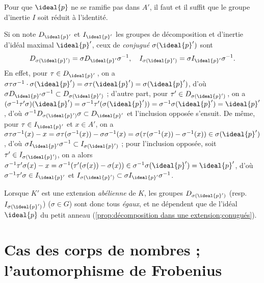 \documentclass[11pt, useosf,
  title in boldface,
  theorem in new line,
  theorem numbering = section,
  number theorems separately,
]{simplivre}
\begin{document}
\enlargethispage*{\baselineskip}
    \begin{corollary}\label{cor:ramification et groupe d'inertie}
        Pour que \( \ideal{p} \) ne se ramifie pas dans \( A' \), il faut et il suffit que le groupe d'inertie \( I \) soit réduit à l'identité.
    \end{corollary}

    \begin{remark}
        Si on note \( D_{\ideal{p}'} \) et \( I_{\ideal{p}'} \) les groupes de décomposition et d'inertie d'idéal maximal \( \ideal{p}' \), ceux de \emph{conjugué} \( \sigma(\ideal{p}') \) sont
        \begin{equation}
            D_{\sigma(\ideal{p}')} = \sigma D_{\ideal{p}'} \sigma^{-1}, \quad
            I_{\sigma(\ideal{p}')} = \sigma I_{\ideal{p}'} \sigma^{-1}.
        \end{equation}
        En effet, pour \( \tau \in D_{\ideal{p}'} \)\,, on a \( \sigma \tau \sigma^{-1} \cdot \sigma(\ideal{p}') = \sigma\tau(\ideal{p}') = \sigma(\ideal{p}') \), d'où \( \sigma D_{\ideal{p}'} \sigma^{-1} \subset D_{\sigma(\ideal{p}')} \) ; d'autre part, pour \( \tau' \in D_{\sigma(\ideal{p}')} \)\,, on a \( (\sigma^{-1} \tau' \sigma)(\ideal{p}') = \sigma^{-1} \tau' (\sigma(\ideal{p}')) = \sigma^{-1} \sigma(\ideal{p}') = \ideal{p}' \), d'où \( \sigma^{-1} D_{\sigma(\ideal{p}')} \sigma \subset D_{\ideal{p}'} \) et l'inclusion opposée s'ensuit. De même, pour \( \tau \in I_{\ideal{p}'} \) et \( x \in A' \), on a \( \sigma\tau\sigma^{-1}(x) - x = \sigma\tau(\sigma^{-1}(x)) - \sigma\sigma^{-1}(x) = \sigma(\tau(\sigma^{-1}(x))-\sigma^{-1}(x)) \in \sigma(\ideal{p}') \), d'où \( \sigma I_{\ideal{p}'} \sigma^{-1} \subset I_{\sigma(\ideal{p}')} \) ; pour l'inclusion opposée, soit \( \tau' \in I_{\sigma(\ideal{p}')} \), on a alors \( \sigma^{-1} \tau' \sigma(x) - x = \sigma^{-1}(\tau'(\sigma(x))-\sigma(x)) \in \sigma^{-1} \sigma(\ideal{p}') = \ideal{p}' \), d'où \( \sigma^{-1} \tau' \sigma \in I_{\ideal{p}'} \) et \( I_{\sigma(\ideal{p}')} \subset \sigma I_{\ideal{p}'} \sigma^{-1} \).

        Lorsque \( K' \) est une extension \emph{abélienne} de \( K \), les groupes \( D_{\sigma(\ideal{p}')} \) (resp. \( I_{\sigma(\ideal{p}')} \)) (\( \sigma \in G \)) sont donc tous \emph{égaux}, et ne dépendent que de l'idéal \( \ideal{p} \) du petit anneau (\cref{prop:décomposition dans une extension;conugués}).
    \end{remark}

\section{Cas des corps de nombres ; l'automorphisme de Frobenius}
\end{document}
